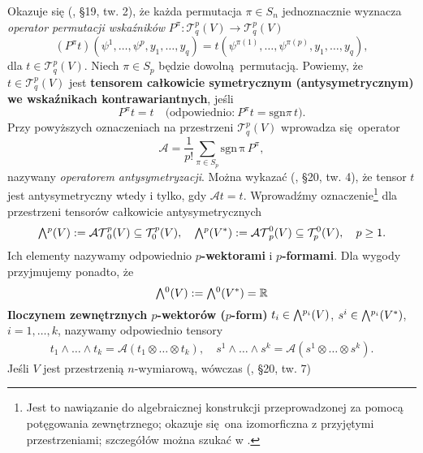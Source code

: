 Okazuje się (\cite{herdegen}, §19, tw. 2), że każda permutacja \(\pi\in S_n\) jednoznacznie wyznacza \emph{operator permutacji wskaźników} \(P^{\pi}:\mathcal{T}_q^p(V)\to\mathcal{T}_q^p(V)\)
\begin{equation*}
    (P^\pi t)(\psi^1, \dots, \psi^p, y_1, \dots, y_q) = t(\psi^{\pi(1)}, \dots, \psi^{\pi(p)}, y_1, \dots, y_q),
\end{equation*} dla \(t\in\mathcal{T}_q^p(V)\). Niech \(\pi\in S_p\) będzie dowolną permutacją. Powiemy, że \(t\in\mathcal{T}_q^p(V)\) jest \textbf{tensorem całkowicie symetrycznym (antysymetrycznym) we wskaźnikach kontrawariantnych}, jeśli 
\begin{equation*}
    P^\pi t = t\quad \text{(odpowiednio:}\ P^\pi t = \mathrm{sgn}\pi\, t\text{)}. 
\end{equation*}
Przy powyższych oznaczeniach na przestrzeni \(\mathcal{T}_q^p(V)\) wprowadza się operator
\begin{equation*}
    \mathcal{A}=\frac{1}{p!}\sum_{\pi\in S_p} \mathrm{sgn\,\pi}\,P^\pi,
\end{equation*}
nazywany \emph{operatorem antysymetryzacji}. Można wykazać (\cite{herdegen}, §20, tw. 4), że tensor \(t\) jest antysymetryczny wtedy i tylko, gdy \(\mathcal{A}t = t\). Wprowadźmy oznaczenie\footnote{Jest to nawiązanie do algebraicznej konstrukcji przeprowadzonej za pomocą potęgowania zewnętrznego; okazuje się ona izomorficzna z przyjętymi przestrzeniami; szczegółów można szukać w \cite{maurin2}.} dla przestrzeni tensorów całkowicie antysymetrycznych
\begin{align*}
    \Exterior^p(V):=\mathcal{AT}^p_0(V)\subseteq \mathcal{T}^p_0(V),\quad \Exterior^p(V^\ast):=\mathcal{AT}^0_p(V)\subseteq\mathcal{T}^0_p(V), \quad p\geq 1.
\end{align*}
Ich elementy nazywamy odpowiednio \textbf{\(p\)-wektorami} i \textbf{\(p\)-formami}. Dla wygody przyjmujemy ponadto, że
\begin{equation*}
     \Exterior^0(V):=\Exterior^0(V^\ast)=\R
\end{equation*}
\textbf{Iloczynem zewnętrznych \(p\)-wektorów (\(p\)-form)} \(t_i\in\Exterior^{p_i}(V)\), \(s^i\in\Exterior^{p_i}(V^\ast)\), \(i=1,\dots, k\), nazywamy odpowiednio tensory
\begin{align*}
    t_1\wedge\dots\wedge t_k = \mathcal{A}(t_1\otimes \dots \otimes t_k), \quad 
    s^1\wedge\dots\wedge s^k = \mathcal{A}(s^1\otimes \dots \otimes s^k).
\end{align*}
Jeśli \(V\) jest przestrzenią \(n\)-wymiarową, wówczas (\cite{herdegen}, §20, tw. 7)
